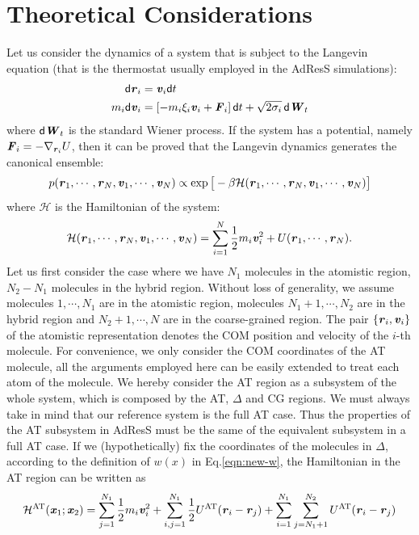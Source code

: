 \documentclass[aps,pre,preprint]{revtex4}
\renewcommand{\v}[1]{\textbf{\textit{#1}}}
\renewcommand{\d}[1]{\textsf{#1}}
\begin{document}
\section{Theoretical Considerations}
Let us consider the dynamics of a system that is subject to the Langevin equation (that is the thermostat usually employed in the AdResS simulations):
\begin{align}
  \d d\v r_i &= \v v_i\d dt\\
  m_i\d d\v v_i &= [-m_i\xi_i\v v_i + \v F_i]\,\d dt + \sqrt{2\sigma_i}\,\d d\v W_t
\end{align}
where $\d d\v W_t$ is the standard Wiener process.  If the system has a
potential, namely $\v F_i = -\nabla_{\v r_i}U$, then it can be proved that the
Langevin dynamics generates the canonical ensemble:
\begin{align}
  p(\v r_1, \cdots, \v r_N, \v v_1, \cdots, \v v_N)
  \propto \exp\big[
  -\beta \mathcal H(\v r_1, \cdots, \v r_N, \v v_1, \cdots, \v v_N)
  \big]
\end{align}
where $\mathcal H$ is the Hamiltonian of the system:
\begin{align}
  \mathcal H(\v r_1, \cdots, \v r_N, \v v_1, \cdots, \v v_N)
  =
  \sum_{i=1}^N\frac12 m_i\v v_i^2 + U(\v r_1, \cdots, \v r_N).
\end{align}
Let us first consider the case where we have $N_1$
molecules in the atomistic region, $N_2 - N_1$ molecules in the hybrid
region.  Without loss of generality, we assume molecules $1, \cdots,
N_1$ are in the atomistic region, molecules $N_1 + 1, \cdots, N_2$ are
in the hybrid region and $N_2+1, \cdots, N$ are in the coarse-grained
region. The pair $\{\v r_i, \v v_i\}$ of the atomistic representation
denotes the COM position and velocity of the $i$-th
molecule. For convenience, we only consider the COM coordinates of the
AT molecule, all the arguments employed here
can be easily extended to treat each atom of the molecule.
We hereby consider the AT region as a subsystem of the whole
system, which is composed by the AT, $\Delta$ and CG
regions. We must always take in mind that our reference system is the full AT case.
Thus the properties of the AT subsystem in AdResS must be the same of the equivalent subsystem in a full AT case.
 If we (hypothetically) fix the coordinates of the molecules in $\Delta$, according to the definition of $w(x)$ in Eq.\ref{eqn:new-w}, the Hamiltonian in the AT region can be written as
\begin{align}\label{eqn:at-h}
  \mathcal H^{\textrm{AT}}(\v x_1; \v x_2) =
  \sum_{j=1}^{N_1}\frac12 m_i\v v_i^2 + 
  \sum_{i,j=1}^{N_1}\frac12 U^{\textrm{AT}}(\v r_i - \v r_j) + 
  \sum_{i=1}^{N_1}\sum_{j=N_1+1}^{N_2} U^{\textrm{AT}}(\v r_i - \v r_j) 
\end{align}
\end{document}
